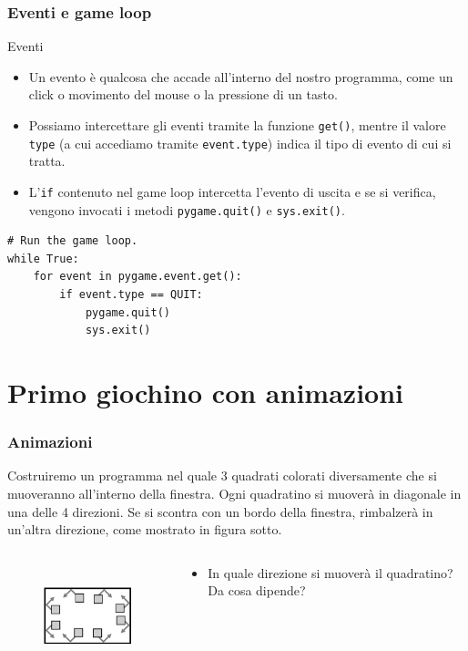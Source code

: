 \documentclass{beamer}
\begin{document}
\begin{frame}[fragile]
\frametitle{Eventi e game loop}
\begin{block}{Eventi}
	\begin{itemize}
		\item Un evento è qualcosa che accade all'interno del nostro programma, come un click o movimento del mouse o la pressione di un tasto.
		\item Possiamo intercettare gli eventi tramite la funzione \texttt{get()}, mentre il valore \texttt{type} (a cui accediamo tramite \texttt{event.type}) indica il tipo di evento di cui si tratta.
		\item L'\texttt{if} contenuto nel game loop intercetta l'evento di uscita e se si verifica, vengono invocati i metodi \texttt{pygame.quit()} e \texttt{sys.exit()}.
	\end{itemize}
\end{block}
\begin{lstlisting}
# Run the game loop.
while True:
    for event in pygame.event.get():
        if event.type == QUIT:
            pygame.quit()
            sys.exit()
\end{lstlisting}
\end{frame}

\section{Primo giochino con animazioni}

\begin{frame}[fragile]
\frametitle{Animazioni}
Costruiremo un programma nel quale 3 quadrati colorati diversamente che si muoveranno all'interno della finestra. Ogni quadratino si muoverà in diagonale in una delle 4 direzioni. Se si scontra con un bordo della finestra, rimbalzerà in un'altra direzione, come mostrato in figura sotto.
\begin{columns}
	\begin{column}[T]{0.5\textwidth}
		\begin{figure}[t]
			\includegraphics[height=3cm, width=4cm]{images/animazioni.png}
		\end{figure}
	\end{column}
	\begin{column}[T]{0.5\textwidth}
		\begin{itemize}
			\item In quale direzione si muoverà il quadratino? Da cosa dipende?
		\end{itemize}
	\end{column}
\end{columns}
\end{frame}
\end{document}
